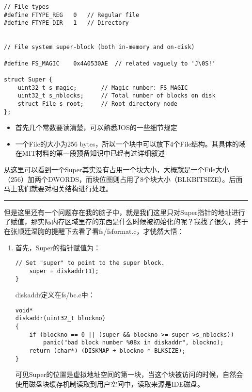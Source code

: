 \documentclass{article}
\begin{document}
\begin{CJK*}{UTF8}{gkai}
\begin{lstlisting}[style=ccode, title={\scriptsize \ttfamily \bfseries inc/fs.h}]
// File types
#define FTYPE_REG	0	// Regular file
#define FTYPE_DIR	1	// Directory


// File system super-block (both in-memory and on-disk)

#define FS_MAGIC	0x4A0530AE	// related vaguely to 'J\0S!'

struct Super {
	uint32_t s_magic;		// Magic number: FS_MAGIC
	uint32_t s_nblocks;		// Total number of blocks on disk
	struct File s_root;		// Root directory node
};
\end{lstlisting}

\begin{itemize}
\item{首先几个常数要读清楚，可以熟悉JOS的一些细节规定}
\item{一个File的大小为256 bytes，所以一个块中可以放下4个File结构。其具体的域在MIT材料的第一段预备知识中已经有过详细叙述}
\end{itemize}

从这里可以看到一个Super其实没有占用一个块大小，大概就是一个File大小（256）加两个DWORDS，而块位图则占用了8个块大小（BLKBITSIZE）。后面马上我们就要对相关结构进行处理。

\vspace{2em}
\hrule
\vspace{2em}

但是这里还有一个问题存在我的脑子中，就是我们这里只对Super指针的地址进行了赋值，那实际内存区域里存的东西是什么时候被初始化的呢？我找了很久，终于在张顺廷湿胸的提醒下去看了看fs/fsformat.c，才恍然大悟：

\begin{enumerate}
\item{首先，Super的指针赋值为：

\begin{lstlisting}[style=ccode, title={\scriptsize \ttfamily \bfseries fs/fs.c: fs\_init()}]
	// Set "super" to point to the super block.
	super = diskaddr(1);
}
\end{lstlisting}

diskaddr定义在fs/bc.c中：

\begin{lstlisting}[style=ccode, title={\scriptsize \ttfamily \bfseries fs/bc.c: diskaddr()}]
void*
diskaddr(uint32_t blockno)
{
	if (blockno == 0 || (super && blockno >= super->s_nblocks))
		panic("bad block number %08x in diskaddr", blockno);
	return (char*) (DISKMAP + blockno * BLKSIZE);
}
\end{lstlisting}

可见Super的位置是虚拟地址空间的第一块，当这个块被访问的时候，自然会使用磁盘块缓存机制读取到用户空间中，读取来源是IDE磁盘。
}


\end{enumerate}
\end{CJK*}
\end{document}
